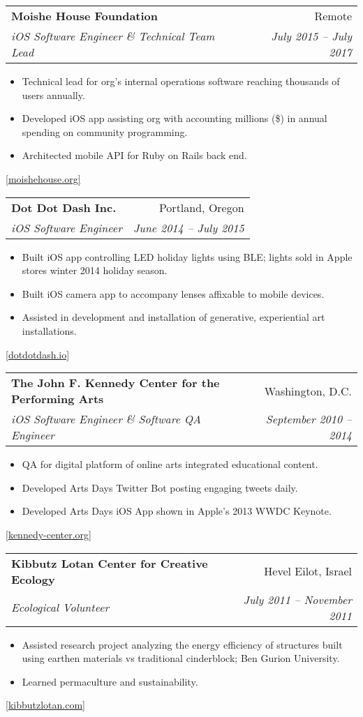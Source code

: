 \documentclass[letterpaper,11pt]{article}
\makeatletter
\newcommand{\resumeSubheading}[4]{
  \vspace{-1pt}\item
    \begin{tabular*}{0.97\textwidth}[t]{l@{\extracolsep{\fill}}r}
      \textbf{#1} & #2 \\
      \textit{\small #3} & \textit{\small #4} \\
    \end{tabular*}\vspace{-5pt}
}
\newcommand{\resumeItemListStart}{\begin{itemize}}
\newcommand{\resumeItemListEnd}{\end{itemize}\vspace{-5pt}}
\makeatother
\begin{document}
  \resumeSubheading
    {Moishe House Foundation}{Remote}
    {iOS Software Engineer \& Technical Team Lead}{July 2015 -- July 2017}
    \resumeItemListStart
      \item Technical lead for org's internal operations software reaching thousands of users annually.
      \item Developed iOS app assisting org with accounting millions (\$) in annual spending on community programming.
      \item Architected mobile API for Ruby on Rails back end.
    \resumeItemListEnd
    \href{https://www.moishehouse.org/}{[moishehouse.org]}

  \resumeSubheading
    {Dot Dot Dash Inc.}{Portland, Oregon}
    {iOS Software Engineer}{June 2014 -- July 2015}
    \resumeItemListStart
      \item Built iOS app controlling LED holiday lights using BLE; lights sold in Apple stores winter 2014 holiday season.
      \item Built iOS camera app to accompany lenses affixable to mobile devices.
      \item Assisted in development and installation of generative, experiential art installations.
    \resumeItemListEnd
    \href{https://www.dotdotdash.io/}{[dotdotdash.io]}

  \resumeSubheading
    {The John F. Kennedy Center for the Performing Arts}{Washington, D.C.}
    {iOS Software Engineer \& Software QA Engineer}{September 2010 -- 2014}
    \resumeItemListStart
      \item QA for digital platform of online arts integrated educational content.
      \item Developed Arts Days Twitter Bot posting engaging tweets daily.
      \item Developed Arts Days iOS App shown in Apple's 2013 WWDC Keynote.
    \resumeItemListEnd
    \href{https://www.kennedy-center.org/education/resources-for-educators/classroom-resources/}{[kennedy-center.org]}

  \resumeSubheading
    {Kibbutz Lotan Center for Creative Ecology}{Hevel Eilot, Israel}
    {Ecological Volunteer}{July 2011 -- November 2011}
    \resumeItemListStart
      \item Assisted research project analyzing the energy efficiency of structures built using earthen materials vs traditional cinderblock; Ben Gurion University.
      \item Learned permaculture and sustainability.
    \resumeItemListEnd
    \href{https://kibbutzlotan.com/en/home-en/}{[kibbutzlotan.com]}
\end{document}
